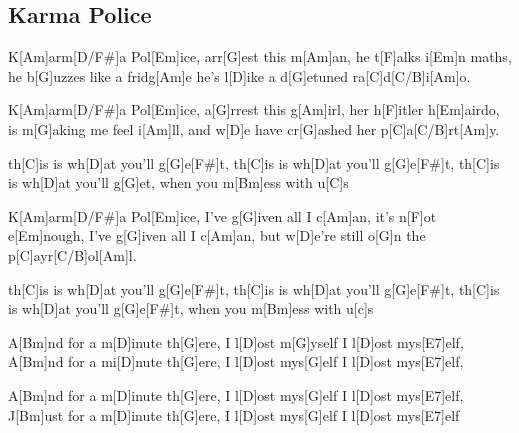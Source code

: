 \subsection*{Karma Police   }
\begin{guitar}
K[Am]arm[D/F#]a Pol[Em]ice,
arr[G]est this m[Am]an,
he t[F]alks i[Em]n maths,
he b[G]uzzes like a fridg[Am]e
he's l[D]ike a d[G]etuned ra[C]d[C/B]i[Am]o. 



K[Am]arm[D/F#]a Pol[Em]ice,
a[G]rrest this g[Am]irl,
her h[F]itler h[Em]airdo,
is m[G]aking me feel i[Am]ll,
and w[D]e have cr[G]ashed her p[C]a[C/B]rt[Am]y. 



th[C]is is wh[D]at you'll g[G]e[F#]t,
th[C]is is wh[D]at you'll g[G]e[F#]t,
th[C]is is wh[D]at you'll g[G]et,
when you m[Bm]ess with u[C]s



K[Am]arm[D/F#]a Pol[Em]ice,
I've g[G]iven all I c[Am]an,
it's n[F]ot e[Em]nough,
I've g[G]iven all I c[Am]an,
but w[D]e're still o[G]n the p[C]ayr[C/B]ol[Am]l.



th[C]is is wh[D]at you'll g[G]e[F#]t,
th[C]is is wh[D]at you'll g[G]e[F#]t,
th[C]is is wh[D]at you'll g[G]e[F#]t,
when you m[Bm]ess with u[c]s



A[Bm]nd for a m[D]inute th[G]ere,
I l[D]ost m[G]yself I l[D]ost mys[E7]elf,
A[Bm]nd for a mi[D]nute th[G]ere,
I l[D]ost mys[G]elf I l[D]ost mys[E7]elf,



A[Bm]nd for a m[D]inute th[G]ere,
I l[D]ost mys[G]elf I l[D]ost mys[E7]elf,
J[Bm]ust for a m[D]inute th[G]ere,
I l[D]ost mys[G]elf I l[D]ost mys[E7]elf 

\end{guitar}
